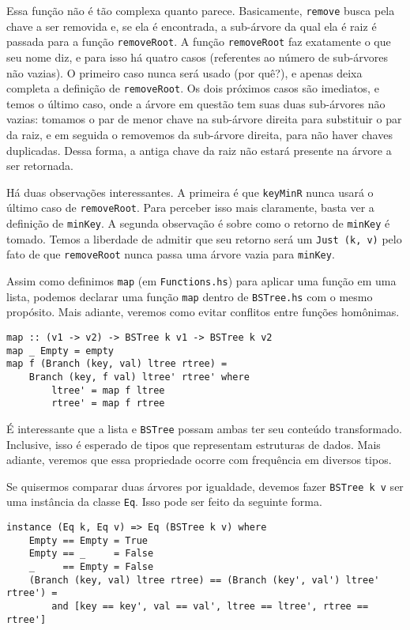 \documentclass[a4paper]{article}
\begin{document}
Essa função não é tão complexa quanto parece.
Basicamente, \texttt{remove} busca pela chave a ser removida e, se ela é encontrada, a sub-árvore da qual ela é raiz é passada para a função \texttt{removeRoot}.
A função \texttt{removeRoot} faz exatamente o que seu nome diz, e para isso há quatro casos (referentes ao número de sub-árvores não vazias).
O primeiro caso nunca será usado (por quê?), e apenas deixa completa a definição de \texttt{removeRoot}.
Os dois próximos casos são imediatos, e temos o último caso, onde a árvore em questão tem suas duas sub-árvores não vazias: tomamos o par de menor chave na sub-árvore direita para substituir o par da raiz, e em seguida o removemos da sub-árvore direita, para não haver chaves duplicadas.
Dessa forma, a antiga chave da raiz não estará presente na árvore a ser retornada.

Há duas observações interessantes.
A primeira é que \texttt{keyMinR} nunca usará o último caso de \texttt{removeRoot}.
Para perceber isso mais claramente, basta ver a definição de \texttt{minKey}.
A segunda observação é sobre como o retorno de \texttt{minKey} é tomado.
Temos a liberdade de admitir que seu retorno será um \texttt{Just (k, v)} pelo fato de que \texttt{removeRoot} nunca passa uma árvore vazia para \texttt{minKey}.

Assim como definimos \texttt{map} (em \texttt{Functions.hs}) para aplicar uma função em uma lista, podemos declarar uma função \texttt{map} dentro de \texttt{BSTree.hs} com o mesmo propósito.
Mais adiante, veremos como evitar conflitos entre funções homônimas.

\begin{verbatim}
map :: (v1 -> v2) -> BSTree k v1 -> BSTree k v2
map _ Empty = empty
map f (Branch (key, val) ltree rtree) =
	Branch (key, f val) ltree' rtree' where
		ltree' = map f ltree
		rtree' = map f rtree
\end{verbatim}

É interessante que a lista e \texttt{BSTree} possam ambas ter seu conteúdo transformado.
Inclusive, isso é esperado de tipos que representam estruturas de dados.
Mais adiante, veremos que essa propriedade ocorre com frequência em diversos tipos.

Se quisermos comparar duas árvores por igualdade, devemos fazer \texttt{BSTree k v} ser uma instância da classe \texttt{Eq}.
Isso pode ser feito da seguinte forma.

\begin{verbatim}
instance (Eq k, Eq v) => Eq (BSTree k v) where
	Empty == Empty = True
	Empty == _     = False
	_     == Empty = False
	(Branch (key, val) ltree rtree) == (Branch (key', val') ltree' rtree') =
		and [key == key', val == val', ltree == ltree', rtree == rtree']
\end{verbatim}
\end{document}
